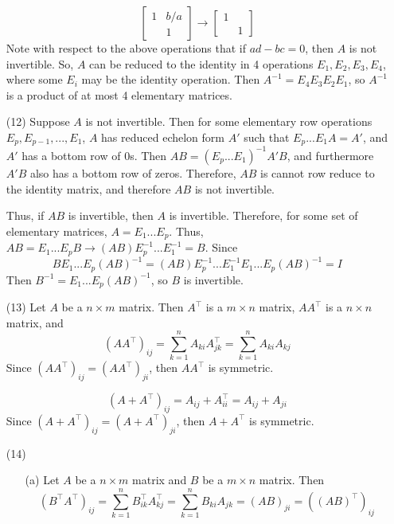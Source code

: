 \documentclass[12pt]{article}
\begin{document}
\begin{itemize}
$$\begin{bmatrix}
1 & b/a \\
& 1
\end{bmatrix} \rightarrow \begin{bmatrix}
1 & \\
& 1
\end{bmatrix}$$
Note with respect to the above operations that if $ad - bc = 0$, then $A$ is not invertible. So, $A$ can be reduced to the identity in 4 operations $E_1, E_2, E_3, E_4$, where some $E_i$ may be the identity operation. Then $A^{-1} = E_4E_3E_2E_1$, so $A^{-1}$ is a product of at most 4 elementary matrices.
\item[(12)]
Suppose $A$ is not invertible. Then for some elementary row operations $E_p, E_{p-1}, ..., E_1$, $A$ has reduced echelon form $A'$ such that $E_p...E_1A = A'$, and $A'$ has a bottom row of 0s. Then $AB = (E_p...E_1)^{-1}A'B$, and furthermore $A'B$ also has a bottom row of zeros. Therefore, $AB$ is cannot row reduce to the identity matrix, and therefore $AB$ is not invertible.

Thus, if $AB$ is invertible, then $A$ is invertible. Therefore, for some set of elementary matrices, $A = E_1...E_p$. Thus, $AB = E_1...E_pB \rightarrow (AB)E_p^{-1}...E_1^{-1} = B$. Since 
$$BE_1...E_p(AB)^{-1} =(AB)E_p^{-1}...E_1^{-1}E_1...E_p(AB)^{-1} = I$$
Then $B^{-1} = E_1...E_p(AB)^{-1}$, so $B$ is invertible.
\item[(13)]
Let $A$ be a $n \times m$ matrix. Then $A^\top$ is a $m \times n$ matrix, $AA^\top$ is a $n \times n$ matrix, and
$$(AA^\top)_{ij} = \sum_{k=1}^n A_{ki}A^\top_{jk} = \sum_{k=1}^n A_{ki}A_{kj}$$
Since $(AA^\top)_{ij} = (AA^\top)_{ji}$, then $AA^\top$ is symmetric.

$$(A + A^\top)_{ij} = A_{ij} + A^\top_{ii} = A_{ij} + A_{ji}$$
Since $(A + A^\top)_{ij} = (A + A^\top)_{ji}$, then $A + A^\top$ is symmetric.
\item[(14)]
\begin{itemize}
\item[(a)] 
Let $A$ be a $n \times m$ matrix and $B$ be a $m \times n$ matrix. Then
$$(B^\top A^\top)_{ij} = \sum_{k=1}^n B^\top_{ik}A^\top_{kj} = \sum_{k=1}^n B_{ki}A_{jk} = (AB)_{ji} = ((AB)^\top)_{ij}$$


\end{itemize}
\end{itemize}
\end{document}
